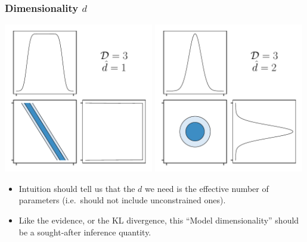 \documentclass[aspectratio=169, handout]{beamer}
\begin{document}
\begin{frame}
    \frametitle{Dimensionality $d$}
    \centerline{%
    \includegraphics[width=0.49\textwidth]{./figures/dimensions_1.pdf}
    \includegraphics[width=0.49\textwidth]{./figures/dimensions_2.pdf}
    }
    \begin{itemize}
        \item Intuition should tell us that the $d$ we need is the effective number of parameters (i.e.\ should not include unconstrained ones).
        \item Like the evidence, or the KL divergence, this ``Model dimensionality'' should be a sought-after inference quantity.
    \end{itemize}

\end{frame}
\end{document}
